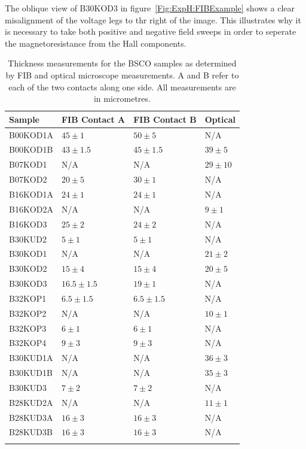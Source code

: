 The oblique view of B30KOD3 in figure~\ref{Fig:ExpH:FIBExample} shows a clear misalignment of the voltage legs to thr right of the image. This illustrates why it is necessary to take both positive and negative field sweeps in order to seperate the magnetoresistance from the Hall components.


\begin{table}
    \begin{center}
           \caption{Thickness measurements for the \ac{BSCO} samples as determined by \ac{FIB} and optical microscope measurements. A and B refer to each of the two contacts along one side. All measurements are in micrometres.}
        \begin{tabular}[htbp]{llll}
\toprule
Sample  & \ac{FIB} Contact A    & \ac{FIB} Contact B    & Optical   \\
\midrule
B00KOD1A	& $45\pm1$	& $50\pm5$	& N/A		\\
B00KOD1B	& $43\pm1.5$	& $45\pm1.5$	& $39\pm5$ 	\\
B07KOD1		& N/A		& N/A		& $29\pm10$	\\
B07KOD2		& $20\pm5$ 	& $30\pm1$ 	& N/A		\\
B16KOD1A	& $24\pm1$ 	& $24\pm1$ 	& N/A		\\
B16KOD2A	& N/A		& N/A		& $9\pm1$ 	\\
B16KOD3 	& $25\pm2$ 	& $24\pm2$ 	& N/A		\\
B30KUD2 	& $5 \pm1$ 	& $5 \pm1$ 	& N/A		\\
B30KOD1 	& N/A		& N/A		& $21\pm2$ 	\\
B30KOD2 	& $15\pm4$	& $15\pm4$	& $20\pm5$ 	\\
B30KOD3 	& $16.5\pm1.5$	& $19\pm1$	& N/A		\\
B32KOP1 	& $6.5\pm1.5$	& $6.5\pm1.5$	& N/A		\\
B32KOP2 	& N/A		& N/A		& $10\pm1$ 	\\
B32KOP3 	& $6\pm1$ 	& $6\pm1$ 	& N/A		\\
B32KOP4 	& $9\pm3$ 	& $9\pm3$ 	& N/A		\\
B30KUD1A	& N/A		& N/A		& $36\pm3$ 	\\
B30KUD1B	& N/A		& N/A		& $35\pm3$ 	\\
B30KUD3 	& $7\pm2$ 	& $7\pm2$ 	& N/A		\\
B28KUD2A	& N/A		& N/A		& $11\pm1$ 	\\
B28KUD3A	& $16\pm3$	& $16\pm3$	& N/A		\\
B28KUD3B	& $16\pm3$	& $16\pm3$	& N/A		\\
\bottomrule
        \label{Table:ExpH:Thicknesses}
        \end{tabular}
    \end{center}
\end{table}

